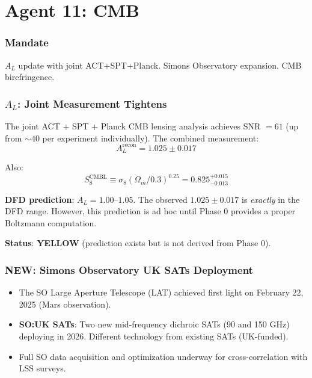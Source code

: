\documentclass[11pt,a4paper]{article}
\newcommand{\YELLOW}{\textcolor{dfdyellow}{\textbf{YELLOW}}}
\newcommand{\NEW}{\textcolor{dfdblue}{\textbf{NEW}}}
\begin{document}
\part{Agent 11: CMB}
\label{part:agent11}

\section{Mandate}

$A_L$ update with joint ACT+SPT+Planck. Simons Observatory expansion. CMB birefringence.

\section{$A_L$: Joint Measurement Tightens}

\begin{tcolorbox}[colback=yellow!5!white, colframe=yellow!60!black,
  title={Qu et al.\ (PRL 136, 2026): $A_L^{\text{recon}} = 1.025 \pm 0.017$}]

The joint ACT + SPT + Planck CMB lensing analysis achieves SNR $= 61$ (up from $\sim 40$ per experiment individually). The combined measurement:
\begin{equation}
A_L^{\text{recon}} = 1.025 \pm 0.017
\end{equation}

Also:
\begin{equation}
S_8^{\text{CMBL}} \equiv \sigma_8 (\Omega_m / 0.3)^{0.25} = 0.825^{+0.015}_{-0.013}
\end{equation}

\textbf{DFD prediction}: $A_L = 1.00$--$1.05$. The observed $1.025 \pm 0.017$ is \emph{exactly} in the DFD range. However, this prediction is ad hoc until Phase 0 provides a proper Boltzmann computation.

\textbf{Status}: \YELLOW{} (prediction exists but is not derived from Phase 0).
\end{tcolorbox}

\section{\NEW: Simons Observatory UK SATs Deployment}

\begin{itemize}
\item The SO Large Aperture Telescope (LAT) achieved first light on February 22, 2025 (Mars observation).
\item \textbf{SO:UK SATs}: Two new mid-frequency dichroic SATs (90 and 150 GHz) deploying in 2026. Different technology from existing SATs (UK-funded).
\item Full SO data acquisition and optimization underway for cross-correlation with LSS surveys.
\end{itemize}
\end{document}
